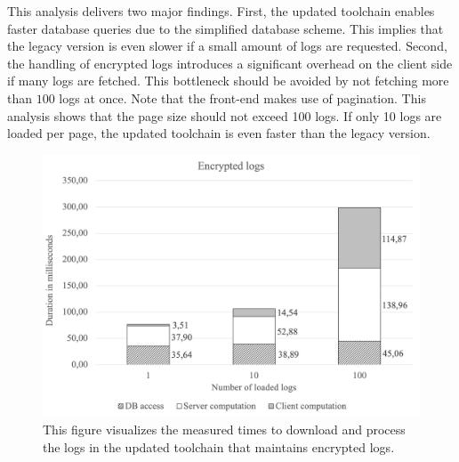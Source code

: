 \documentclass[../main.tex]{subfiles}
\begin{document}
This analysis delivers two major findings.
First, the updated toolchain enables faster database queries due to the simplified database scheme.
This implies that the legacy version is even slower if a small amount of logs are requested.
Second, the handling of encrypted logs introduces a significant overhead on the client side if many logs are fetched.
This bottleneck should be avoided by not fetching more than $100$ logs at once.
Note that the front-end makes use of pagination.
This analysis shows that the page size should not exceed 100 logs.
If only 10 logs are loaded per page, the updated toolchain is even faster than the legacy version.

\begin{figure}[ht]
    \includegraphics[scale=0.63]{../img/07/encrypted.png}
    \centering
    \caption[Encryption duration]{This figure visualizes the measured times to download and process the logs in the updated toolchain that maintains encrypted logs.}
    \label{fig:perf-encrypted}
\end{figure}
\end{document}
